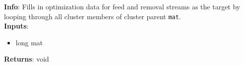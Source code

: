 \textbf{Info}: Fills in optimization data for feed and removal streams as the
target by looping through all cluster members of cluster parent \texttt{mat}. \\

\noindent \textbf{Inputs}:
\begin{itemize}
\item{long mat}
\end{itemize}

\noindent \textbf{Returns}: void
